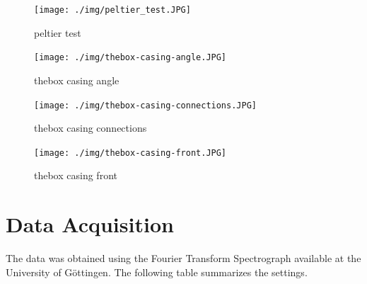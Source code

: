 \documentclass[master,       %
               twoside,        %
               BCOR10mm,       %
               ngerman,english  %
               ]{GAUBM_astro}
\begin{document}
\begin{figure}[h!]
\centering
\texttt{[image: ./img/peltier\_test.JPG]}
\caption{peltier test}
\label{fig:peltier-test}
\end{figure}


\begin{figure}[h!]
\centering
\texttt{[image: ./img/thebox-casing-angle.JPG]}
\caption{thebox casing angle}
\label{fig:thebox-casing-angle}
\end{figure}


\begin{figure}[h!]
\centering
\texttt{[image: ./img/thebox-casing-connections.JPG]}
\caption{thebox casing connections}
\label{fig:thebox-casing-connections}
\end{figure}


\begin{figure}[h!]
\centering
\texttt{[image: ./img/thebox-casing-front.JPG]}
\caption{thebox casing front}
\label{fig:thebox-casing-front}
\end{figure}






\section{Data Acquisition}
The data was obtained using the Fourier Transform Spectrograph available at the University of G\"ottingen. The following table summarizes the settings.
\end{document}
